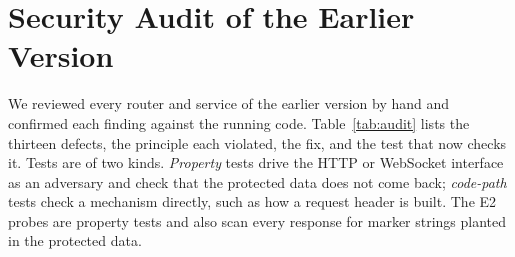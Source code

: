 \documentclass[conference]{IEEEtran}
\begin{document}
\section{Security Audit of the Earlier Version}
\label{sec:audit}

We reviewed every router and service of the earlier version by hand and confirmed each finding against the running code. Table~\ref{tab:audit} lists the thirteen defects, the principle each violated, the fix, and the test that now checks it. Tests are of two kinds. \emph{Property} tests drive the HTTP or WebSocket interface as an adversary and check that the protected data does not come back; \emph{code-path} tests check a mechanism directly, such as how a request header is built. The E2 probes are property tests and also scan every response for marker strings planted in the protected data.
\end{document}
